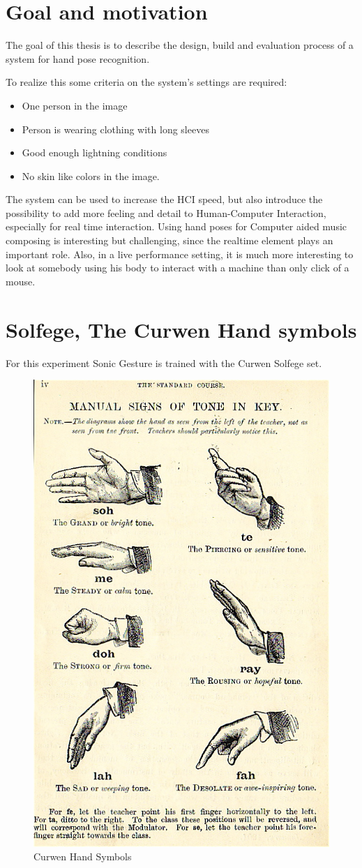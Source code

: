 \section{Goal and motivation}
The goal of this thesis is to describe the design, build and evaluation process of a system for hand pose recognition.

To realize this some criteria on the system's settings are required:
\begin{itemize}
	\item One person in the image
	\item Person is wearing clothing with long sleeves
	\item Good enough lightning conditions
	\item No skin like colors in the image.
\end{itemize}

The system can be used to increase the HCI speed, but also introduce the possibility to add more feeling and detail to Human-Computer Interaction, especially for real time interaction. Using hand poses for Computer aided music composing is interesting but challenging, since the realtime element plays an important role. Also, in a live performance setting, it is much more interesting to look at somebody using his body to interact with a machine than only click of a mouse.


\section{Solfege, The Curwen Hand symbols}

For this experiment Sonic Gesture is trained with the Curwen Solfege set\cite{choksy1999}.


\begin{figure}[htbp]
	\center{}
	\label{fig:curwen}
	\includegraphics[width=0.3\linewidth]{figures/curwen.jpg}
	\caption{Curwen Hand Symbols}
\end{figure}

